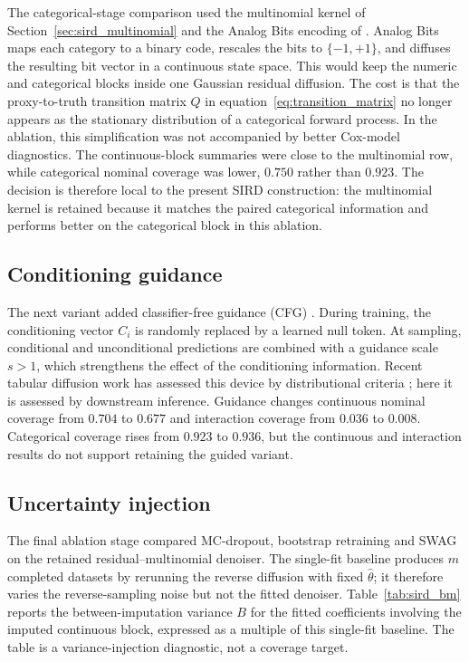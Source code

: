 The categorical-stage comparison used the multinomial kernel of Section~\ref{sec:sird_multinomial} and the Analog Bits encoding of \citet{chen2023analog}. Analog Bits maps each category to a binary code, rescales the bits to \(\{-1,+1\}\), and diffuses the resulting bit vector in a continuous state space. This would keep the numeric and categorical blocks inside one Gaussian residual diffusion. The cost is that the proxy-to-truth transition matrix \(Q\) in equation~\eqref{eq:transition_matrix} no longer appears as the stationary distribution of a categorical forward process. In the ablation, this simplification was not accompanied by better Cox-model diagnostics. The continuous-block summaries were close to the multinomial row, while categorical nominal coverage was lower, \(0.750\) rather than \(0.923\). The decision is therefore local to the present SIRD construction: the multinomial kernel is retained because it matches the paired categorical information and performs better on the categorical block in this ablation.

\subsection{Conditioning guidance}
\label{sec:sird_ablation_guidance}

The next variant added classifier-free guidance (CFG) \citep{ho2022classifier}. During training, the conditioning vector \(C_i\) is randomly replaced by a learned null token. At sampling, conditional and unconditional predictions are combined with a guidance scale \(s>1\), which strengthens the effect of the conditioning information. Recent tabular diffusion work has assessed this device by distributional criteria \citep{shi2025tabdiff}; here it is assessed by downstream inference. Guidance changes continuous nominal coverage from \(0.704\) to \(0.677\) and interaction coverage from \(0.036\) to \(0.008\). Categorical coverage rises from \(0.923\) to \(0.936\), but the continuous and interaction results do not support retaining the guided variant.

\subsection{Uncertainty injection}
\label{sec:sird_uncertainty}

The final ablation stage compared MC-dropout, bootstrap retraining and SWAG on the retained residual--multinomial denoiser. The single-fit baseline produces \(m\) completed datasets by rerunning the reverse diffusion with fixed \(\hat\theta\); it therefore varies the reverse-sampling noise but not the fitted denoiser. Table~\ref{tab:sird_bm} reports the between-imputation variance \(B\) for the fitted coefficients involving the imputed continuous block, expressed as a multiple of this single-fit baseline. The table is a variance-injection diagnostic, not a coverage target.

